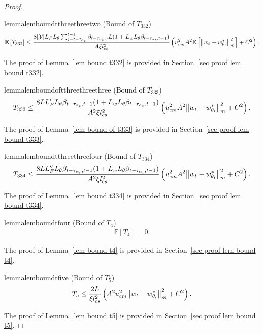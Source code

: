 \documentclass[twoside,11pt]{article}
\newcommand{\fY}{\mathcal{Y}}
\newcommand{\E}{\mathbb{E}}
\newcommand{\ny}{{|\fY|}}
\numberwithin{assucounter}{section}
\begin{document}
\begin{proof}
\begin{restatable}{lemma}{lemboundtthreethreetwo}
  \label{lem bound t332}
  (Bound of $T_{332}$)
  \begin{align}
      \E\left[T_{332}\right]
      \leq \frac{8 \ny L_P L_\theta \sum_{j=t-\tau_{\alpha_t}}^{t-1}\beta_{t-\tau_{\alpha_t}, j} L(1 + L_wL_\theta \beta_{t-\tau_{\alpha_t}, t-1})}{A \xi l_{cs}^2} \left(u_{cm}^2 A^2 \E\left[ \norm{w_t - w^*_{\theta_t}}_m^2 \right] + C^2\right).
  \end{align}
\end{restatable}
\noindent
The proof of Lemma~\ref{lem bound t332} is provided in Section~\ref{sec proof lem bound t332}.

\begin{restatable}{lemma}{lemboundoftthreethreethree}
  \label{lem bound of t333}
  (Bound of $T_{333}$)
  \begin{align}
  T_{333} \leq \frac{8LL_F' L_\theta \beta_{t-\tau_{\alpha_t}, t-1} (1 + L_wL_\theta \beta_{t-\tau_{\alpha_t}, t-1})}{A^2 \xi l_{cs}^2}\left(u_{cm}^2 A^2 \norm{w_t - w^*_{\theta_t}}_m^2 + C^2\right).
  \end{align}
\end{restatable}
\noindent
The proof of Lemma~\ref{lem bound of t333} is provided in Section~\ref{sec proof lem bound t333}.

\begin{restatable}{lemma}{lemboundtthreethreefour}
  \label{lem bound t334}
  (Bound of $T_{334}$)
  \begin{align}
  T_{334} \leq \frac{8LL_F'' L_\theta \beta_{t-\tau_{\alpha_t}, t-1}(1 + L_wL_\theta \beta_{t-\tau_{\alpha_t}, t-1})}{A^2 \xi l_{cs}^2}\left(u_{cm}^2 A^2 \norm{w_t - w^*_{\theta_t}}_m^2 + C^2\right).
  \end{align}
\end{restatable}
\noindent
The proof of Lemma~\ref{lem bound t334} is provided in Section~\ref{sec proof lem bound t334}.

\begin{restatable}{lemma}{lemboundtfour}
  \label{lem bound t4}
  (Bound of $T_4$)
  \begin{align}
    \E\left[T_4\right] = 0.
  \end{align}
\end{restatable}
\noindent
The proof of Lemma~\ref{lem bound t4} is provided in Section~\ref{sec proof lem bound t4}.

\begin{restatable}{lemma}{lemboundtfive}
  \label{lem bound t5}
  (Bound of $T_5$)
  \begin{align}
      T_5 
      \leq \frac{2L}{\xi l_{cs}^2}\left(A^2 u_{cm}^2 \norm{w_t - w^*_{\theta_t}}_m^2 + C^2\right).
  \end{align}
\end{restatable}
\noindent
The proof of Lemma~\ref{lem bound t5} is provided in Section~\ref{sec proof lem bound t5}.



\end{proof}
\end{document}
